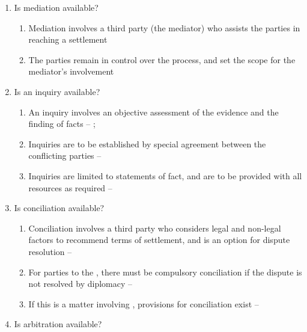 \begin{enumerate}
\begin{enumerate}
        \item Is mediation available?
        \begin{enumerate}
            \item Mediation involves a third party (the mediator) who assists the parties in reaching a settlement
            \item The parties remain in control over the process, and set the scope for the mediator's involvement
        \end{enumerate}
        \item Is an inquiry available?
        \begin{enumerate}
            \item An inquiry involves an objective assessment of the evidence and the finding of facts -- ; 
            \item Inquiries are to be established by special agreement between the conflicting parties -- 
            \item Inquiries are limited to statements of fact, and are to be provided with all resources as required -- 
        \end{enumerate}
        \item Is conciliation available?
        \begin{enumerate}
            \item Conciliation involves a third party who considers legal and non-legal factors to recommend terms of settlement, and is an option for dispute resolution -- 
            \item For parties to the , there must be compulsory conciliation if the dispute is not resolved by diplomacy -- 
            \item If this is a matter involving , provisions for conciliation exist -- 
        \end{enumerate}
        \item Is arbitration available?

\end{enumerate}
\end{enumerate}

